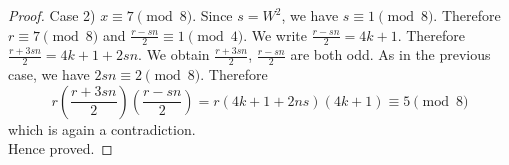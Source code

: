 \documentclass[10pt,a4paper]{amsart}
\begin{document}
\begin{proof}
\noindent Case 2)  $x\equiv 7\pmod{8}$. Since $s=W^{2}$, we have $s\equiv 1\pmod{8}$. Therefore $r\equiv 7\pmod{8}$ and $\frac{r-sn}{2}\equiv 1\pmod{4}$. We write  $\frac{r-sn}{2}=4k+1$. Therefore $\frac{r+3sn}{2}=4k+1+2sn$. We obtain $\frac{r+3sn}{2}$, $\frac{r-sn}{2}$ are both odd. As in the previous case, we have $2sn\equiv 2\pmod{8}$. Therefore
$$r\left(\frac{r+3sn}{2}\right)\left(\frac{r-sn}{2}\right)=r(4k+1+2ns)(4k+1)\equiv 5\pmod{8}$$
which is again a contradiction.\\
\noindent Hence proved.
\end{proof}
\end{document}
